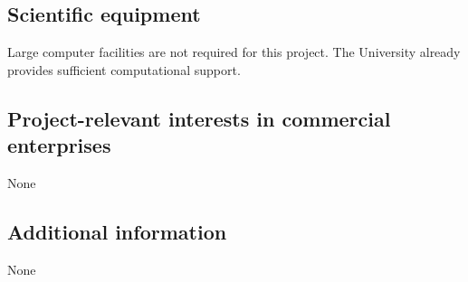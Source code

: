 \documentclass[10pt,fleqn,twoside]{article}
\begin{document}
\subsection{Scientific equipment}

Large computer facilities are not required for this project. The
University already provides sufficient computational support. 


\subsection{Project-relevant interests in commercial enterprises}

None


\subsection{Additional information}

None
\end{document}
